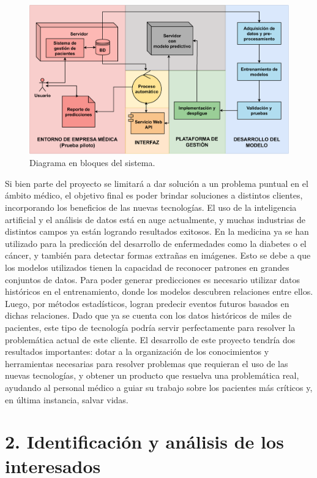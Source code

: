 \documentclass[
11pt, %
]{charter}
\begin{document}
\begin{figure}[htpb]
\centering 
\includegraphics[width=.85\textwidth]{./Figuras/DiagramaDeBloques.pdf}
\caption{Diagrama en bloques del sistema.}
\label{fig:diagBloques}
\end{figure}

Si bien parte del proyecto se limitará a dar solución a un problema puntual en el ámbito médico, el objetivo final es poder brindar soluciones a distintos clientes, incorporando los beneficios de las nuevas tecnologías.
El uso de la inteligencia artificial y el análisis de datos está en auge actualmente, y muchas industrias de distintos campos ya están logrando resultados exitosos. En la medicina ya se han utilizado para la predicción del desarrollo de enfermedades como la diabetes o el cáncer, y también para detectar formas extrañas en imágenes. 
Esto se debe a que los modelos utilizados tienen la capacidad de reconocer patrones en grandes conjuntos de datos.
Para poder generar predicciones es necesario utilizar datos históricos en el entrenamiento, donde los modelos descubren relaciones entre ellos. Luego, por métodos estadísticos, logran predecir eventos futuros basados en dichas relaciones.
Dado que ya se cuenta con los datos históricos de miles de pacientes, este tipo de tecnología podría servir perfectamente para resolver la problemática actual de este cliente. 
El desarrollo de este proyecto tendría dos resultados importantes: dotar a la organización de los conocimientos y herramientas necesarias para resolver problemas que requieran el uso de las nuevas tecnologías, y obtener un producto que resuelva una problemática real, ayudando al personal médico a guiar su trabajo sobre los pacientes más críticos y, en última instancia, salvar vidas.

\section{2. Identificación y análisis de los interesados}
\label{sec:interesados}
\end{document}
